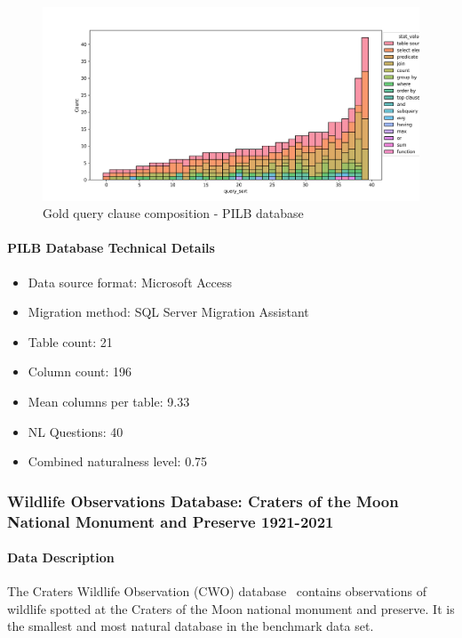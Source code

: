 \begin{figure}[H]
  \centering
  \includegraphics[width=\linewidth]{figures/query-stats/PacificIslandLandbirds-stats-clause-counts.png}
  \caption{Gold query clause composition - PILB database}
  \label{fig:query-complexity-pilb}
\end{figure}

\paragraph{PILB Database Technical Details}
\begin{itemize}
  \item Data source format: Microsoft Access
  \item Migration method: SQL Server Migration Assistant
  \item Table count: 21
  \item Column count: 196
  \item Mean columns per table: 9.33
  \item NL Questions: 40
  \item Combined naturalness level: 0.75 
\end{itemize}

\subsubsection{Wildlife Observations Database: Craters of the Moon National Monument and Preserve 1921-2021}

\paragraph{Data Description}
The Craters Wildlife Observation (CWO) database~\cite{craters-of-the-moon-wildlife} contains observations of wildlife spotted at the Craters of the Moon national monument and preserve.
It is the smallest and most natural database in the benchmark data set.

